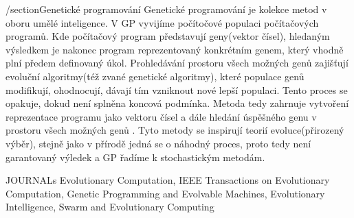 /section{Genetické programování} 
Genetické programování je kolekce metod v oboru umělé inteligence. V  GP vyvijíme počítočové populaci počítačových programů. Kde počítačový program představují geny(vektor čísel), hledaným výsledkem je nakonec program reprezentovaný konkrétním genem, který vhodně plní předem definovaný úkol. Prohledávání prostoru všech možných genů zajišťují evoluční algoritmy(též zvané genetické algoritmy), které populace genů modifikují, ohodnocují, dávají tím vzniknout nové lepší populaci. Tento proces se opakuje, dokud není splněna koncová podmínka. Metoda tedy zahrnuje vytvoření reprezentace programu jako vektoru čísel a dále hledání úspěšného genu v prostoru všech možných genů \citep{field}. Tyto metody se inspirují teorií evoluce(přirozený výběr), stejně jako v přírodě jedná se o náhodný proces, proto tedy není garantovaný výledek a GP řadíme k stochastickým metodám.

JOURNALs 
Evolutionary Computation,
IEEE Transactions on Evolutionary Computation, 
Genetic Programming and Evolvable Machines,
Evolutionary Intelligence, 
Swarm and Evolutionary Computing
